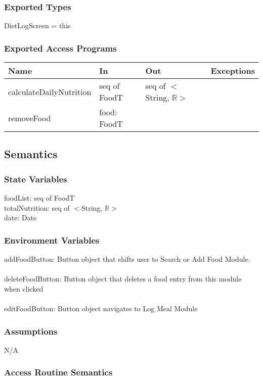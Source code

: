 \documentclass[12pt, titlepage]{article}
\begin{document}
\subsubsection{Exported Types}
DietLogScreen = this

\subsubsection{Exported Access Programs}

\begin{tabular}{| l | l | l | l |}
\hline
{\textbf{Name}} & {\textbf{In}} & {\textbf{Out}} & {\textbf{Exceptions}}\\
\hline
{calculateDailyNutrition} &seq of FoodT &seq of $<$String, \(\mathbb{R}\)$>$ &\\
\hline
{removeFood} &food: FoodT & & \\
\hline
\end{tabular}

\subsection{Semantics}

\subsubsection{State Variables}
foodList: seq of FoodT\\
totalNutrition: seq of $<$String, \(\mathbb{R}\)$>$\\
date: Date

\subsubsection{Environment Variables}

addFoodButton: Button object that shifts user to Search or Add Food Module.\\\\
deleteFoodButton: Button object that deletes a food entry from this module when clicked\\\\
editFoodButton: Button object navigates to Log Meal Module


\subsubsection{Assumptions}

N/A

\subsubsection{Access Routine Semantics}
\end{document}
